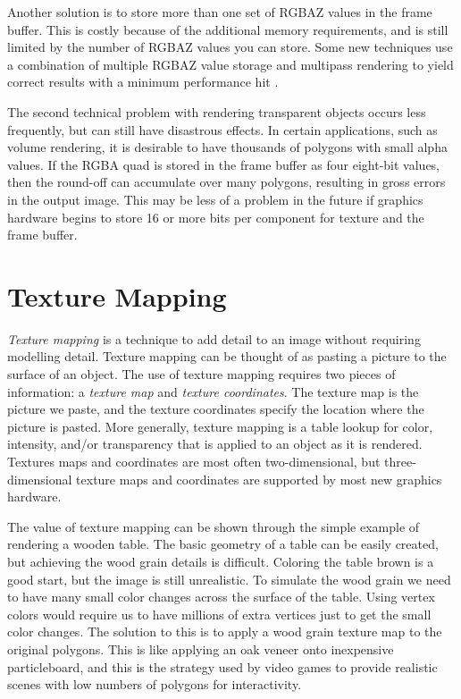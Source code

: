 Another solution is to store more than one set of RGBAZ values in the frame buffer. This is costly because of the additional memory requirements, and is still limited by the number of RGBAZ values you can store. Some new techniques use a combination of multiple RGBAZ value storage and multipass rendering to yield correct results with a minimum performance hit \cite{Hodges92}.

The second technical problem with rendering transparent objects occurs less frequently, but can still have disastrous effects. In certain applications, such as volume rendering, it is desirable to have thousands of polygons with small alpha values. If the RGBA quad is stored in the frame buffer as four eight-bit values, then the round-off can accumulate over many polygons, resulting in gross errors in the output image. This may be less of a problem in the future if graphics hardware begins to store 16 or more bits per component for texture and the frame buffer.

\section{Texture Mapping}

\emph{Texture mapping} is a technique to add detail to an image without requiring modelling detail. Texture mapping can be thought of as pasting a picture to the surface of an object. The use of texture mapping requires two pieces of information: a \emph{texture map} and \emph{texture coordinates}. The texture map is the picture we paste, and the texture coordinates specify the location where the picture is pasted. More generally, texture mapping is a table lookup for color, intensity, and/or transparency that is applied to an object as it is rendered. Textures maps and coordinates are most often two-dimensional, but three-dimensional texture maps and coordinates are supported by most new graphics hardware.

The value of texture mapping can be shown through the simple example of rendering a wooden table. The basic geometry of a table can be easily created, but achieving the wood grain details is difficult. Coloring the table brown is a good start, but the image is still unrealistic. To simulate the wood grain we need to have many small color changes across the surface of the table. Using vertex colors would require us to have millions of extra vertices just to get the small color changes. The solution to this is to apply a wood grain texture map to the original polygons. This is like applying an oak veneer onto inexpensive particleboard, and this is the strategy used by video games to provide realistic scenes with low numbers of polygons for interactivity.

